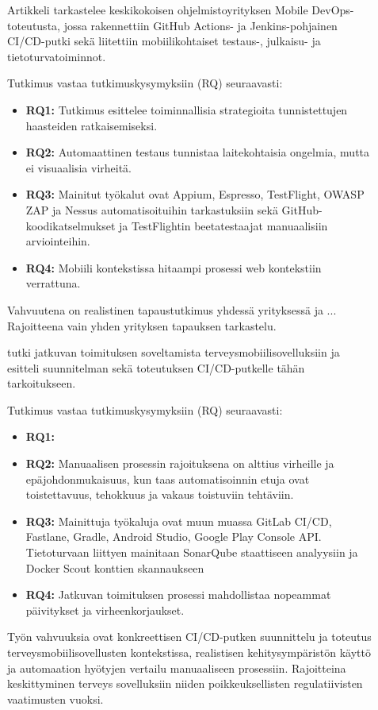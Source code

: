 \documentclass[bscthesis,finnish,oneside,biblatex]{uefcsthesis}
\begin{document}
    \begin{description}
        \item[\cite{ozdenizci2024mobilizing}] Artikkeli tarkastelee keskikokoisen ohjelmistoyrityksen Mobile DevOps-toteutusta, jossa rakennettiin GitHub Actions- ja Jenkins-pohjainen CI/CD-putki sekä liitettiin mobiilikohtaiset testaus-, julkaisu- ja tietoturvatoiminnot.

        Tutkimus vastaa tutkimuskysymyksiin (RQ) seuraavasti:
        \begin{itemize}
            \item \textbf{RQ1:} Tutkimus esittelee toiminnallisia strategioita tunnistettujen haasteiden ratkaisemiseksi.
            \item \textbf{RQ2:} Automaattinen testaus tunnistaa laitekohtaisia ongelmia, mutta ei visuaalisia virheitä.
            \item \textbf{RQ3:} Mainitut työkalut ovat Appium, Espresso, TestFlight, OWASP ZAP ja Nessus automatisoituihin tarkastuksiin sekä GitHub-koodikatselmukset ja TestFlightin beetatestaajat manuaalisiin arviointeihin.
            \item \textbf{RQ4:} Mobiili kontekstissa hitaampi prosessi web kontekstiin verrattuna.
        \end{itemize}

        Vahvuutena on realistinen tapaustutkimus yhdessä yrityksessä ja ... Rajoitteena vain yhden yrityksen tapauksen tarkastelu.
    \end{description}

    \begin{description}
        \item[\cite{byman2024continuous}] tutki jatkuvan toimituksen soveltamista terveysmobiilisovelluksiin ja esitteli suunnitelman sekä toteutuksen CI/CD-putkelle tähän tarkoitukseen.

        Tutkimus vastaa tutkimuskysymyksiin (RQ) seuraavasti:
        \begin{itemize}
            \item \textbf{RQ1:}
            \item \textbf{RQ2:} Manuaalisen prosessin rajoituksena on alttius virheille ja epäjohdonmukaisuus, kun taas automatisoinnin etuja ovat toistettavuus, tehokkuus ja vakaus toistuviin tehtäviin.
            \item \textbf{RQ3:} Mainittuja työkaluja ovat muun muassa GitLab CI/CD, Fastlane, Gradle, Android Studio, Google Play Console API. Tietoturvaan liittyen mainitaan SonarQube staattiseen analyysiin ja Docker Scout konttien skannaukseen
            \item \textbf{RQ4:} Jatkuvan toimituksen prosessi mahdollistaa nopeammat päivitykset ja virheenkorjaukset.
        \end{itemize}

        Työn vahvuuksia ovat konkreettisen CI/CD-putken suunnittelu ja toteutus terveysmobiilisovellusten kontekstissa, realistisen kehitysympäristön käyttö ja automaation hyötyjen vertailu manuaaliseen prosessiin. Rajoitteina keskittyminen terveys sovelluksiin niiden poikkeuksellisten regulatiivisten vaatimusten vuoksi.
    \end{description}
\end{document}

